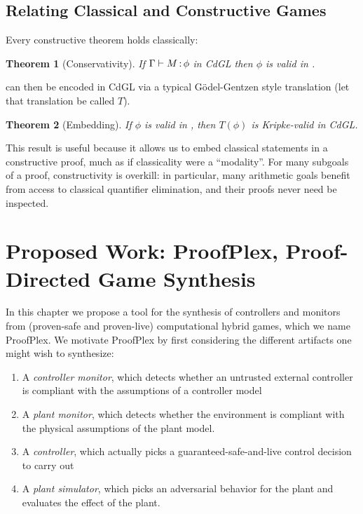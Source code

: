 \documentclass[12pt]{cmuthesis}
\newtheorem{theorem}{Theorem}
\theoremstyle{definition}
\theoremstyle{remark}
\newcommand{\CdGL}{\textsf{CdGL}\xspace}
\newcommand{\ProofPlex}{ProofPlex\xspace}
\begin{document}
\section{Relating Classical and Constructive Games}
Every constructive theorem holds classically:
\begin{theorem}[Conservativity]
If $\Gamma \vdash M\mathop{:}\phi$ in \CdGL then $\phi$ is valid in \dGL.
\end{theorem}

\dGL can then be encoded in \CdGL via a typical G\"{o}del-Gentzen style translation (let that translation be called $T$).
\begin{theorem}[\dGL Embedding]
  If $\phi$ is valid in \dGL, then $T(\phi)$ is Kripke-valid in \CdGL.
\end{theorem}
This result is useful because it allows us to embed classical statements in a constructive proof, much as if classicality were a ``modality''.
For many subgoals of a proof, constructivity is overkill: in particular, many arithmetic goals benefit from access to classical quantifier elimination, and their proofs never need be inspected.

\chapter{Proposed Work: \ProofPlex, Proof-Directed Game Synthesis}
\label{ch:proofplex}
In this chapter we propose a tool for the synthesis of controllers and monitors from (proven-safe and proven-live) computational hybrid games, which we name \ProofPlex.
We motivate \ProofPlex by first considering the different artifacts one might wish to synthesize:
\begin{enumerate}
\item A \emph{controller monitor}, which detects whether an untrusted external controller is compliant with the assumptions of a controller model
\item A \emph{plant monitor}, which detects whether the environment is compliant with the physical assumptions of the plant model.
\item A \emph{controller}, which actually picks a guaranteed-safe-and-live control decision to carry out
\item A \emph{plant simulator}, which picks an adversarial behavior for the plant and evaluates the effect of the plant.
\end{enumerate}
\end{document}
